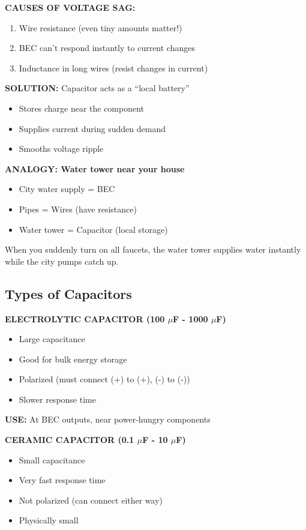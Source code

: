 \documentclass[11pt,letterpaper]{article}
\begin{document}
\textbf{CAUSES OF VOLTAGE SAG:}
\begin{enumerate}
\item Wire resistance (even tiny amounts matter!)
\item BEC can't respond instantly to current changes
\item Inductance in long wires (resist changes in current)
\end{enumerate}

\textbf{SOLUTION:} Capacitor acts as a ``local battery''
\begin{itemize}
\item Stores charge near the component
\item Supplies current during sudden demand
\item Smooths voltage ripple
\end{itemize}

\textbf{ANALOGY: Water tower near your house}
\begin{itemize}
\item City water supply = BEC
\item Pipes = Wires (have resistance)
\item Water tower = Capacitor (local storage)
\end{itemize}

When you suddenly turn on all faucets, the water tower supplies water instantly while the city pumps catch up.

\subsection{Types of Capacitors}

\textbf{ELECTROLYTIC CAPACITOR (100 $\mu$F - 1000 $\mu$F)}
\begin{itemize}
\item Large capacitance
\item Good for bulk energy storage
\item Polarized (must connect (+) to (+), (-) to (-))
\item Slower response time
\end{itemize}

\textbf{USE:} At BEC outputs, near power-hungry components

\textbf{CERAMIC CAPACITOR (0.1 $\mu$F - 10 $\mu$F)}
\begin{itemize}
\item Small capacitance
\item Very fast response time
\item Not polarized (can connect either way)
\item Physically small
\end{itemize}
\end{document}
